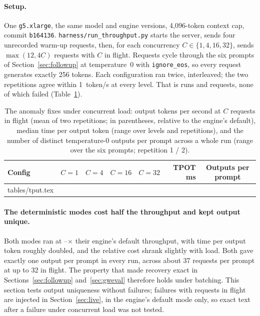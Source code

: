 \documentclass[10pt,twocolumn]{article}
\makeatletter
\def\TputRows{\@@input tables/tput.tex }
\makeatother
\begin{document}
\paragraph{Setup.} One \texttt{g5.xlarge}, the same model and engine versions,
4{,}096-token context cap, commit \texttt{b164136}.
\texttt{harness/run\_throughput.py} starts the server, sends four unrecorded
warm-up requests, then, for each concurrency $C\in\{1,4,16,32\}$, sends
$\max(12,4C)$ requests with $C$ in flight. Requests cycle through the six
prompts of Section~\ref{sec:followup} at temperature~0 with
\texttt{ignore\_eos}, so every request generates exactly 256 tokens. Each
configuration ran twice, interleaved; the two repetitions agree within
1~token/s at every level. That is \TputRuns{} runs and \TputRequests{}
requests, none of which failed (Table~\ref{tab:tput}).

\begin{table}[t]
\centering\small
\caption{The anomaly fixes under concurrent load: output tokens per second at
$C$ requests in flight (mean of two repetitions; in parentheses, relative to
the engine's default), median time per output token (range over levels and
repetitions), and the number of distinct temperature-0 outputs per prompt
across a whole run (range over the six prompts; repetition 1 / 2).}
\label{tab:tput}
\begin{tabular}{@{}lccccrc@{}}
\toprule
Config & $C{=}1$ & $C{=}4$ & $C{=}16$ & $C{=}32$ & TPOT ms & Outputs per prompt \\
\midrule
\TputRows
\bottomrule
\end{tabular}
\end{table}

\paragraph{The deterministic modes cost half the throughput and kept output
unique.} Both modes ran at \TputDetMin--\TputDetMax$\times$ their engine's
default throughput, with time per output token roughly doubled, and the
relative cost shrank slightly with load. Both gave exactly one output per
prompt in every run, across about 37 requests per prompt at up to 32 in
flight. The property that made recovery exact in
Sections~\ref{sec:followup} and~\ref{sec:gweval} therefore holds under
batching. This section tests output uniqueness without failures; failures
with requests in flight are injected in Section~\ref{sec:live}, in the
engine's default mode only, so exact text after a failure under concurrent
load was not tested.
\end{document}
